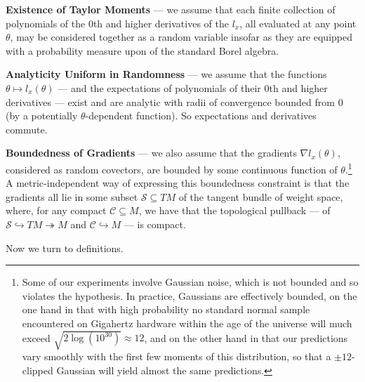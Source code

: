 \documentclass[anon,12pt]{colt2021} %
\newcommand{\Cc}{\mathcal{C}}   \newcommand{\CC}{\mathbb{C}}
\newcommand{\Ss}{\mathcal{S}}
\begin{document}
        \textbf{Existence of Taylor Moments} --- we assume
        that each finite collection of polynomials of the $0$th and higher
        derivatives of the $l_x$, all evaluated at any point $\theta$, may be
        considered together as a random variable insofar as they are equipped
        with a probability measure upon of the standard Borel algebra.

        \textbf{Analyticity Uniform in Randomness} --- we assume that
        the functions $\theta \mapsto l_x(\theta)$ --- and the expectations
        of polynomials of their $0$th and higher derivatives --- exist and are
        analytic with radii of convergence bounded from $0$ (by a potentially
        $\theta$-dependent function).  So expectations and derivatives commute. 

        \textbf{Boundedness of Gradients} --- we also assume that the gradients
        $\nabla l_x(\theta)$, considered as random covectors, are bounded by
        some continuous function of $\theta$.\footnote{
            Some of our experiments involve Gaussian noise, which is not
            bounded and so violates the hypothesis.  In practice, Gaussians are
            effectively bounded, on the one hand in that with high
            probability no standard normal sample encountered on Gigahertz
            hardware within the age of the universe will much exceed $\sqrt{2
            \log(10^{30})} \approx 12$, and on the other hand in that
            our predictions vary smoothly with the first few moments of this
            distribution, so that a $\pm 12$-clipped Gaussian will yield almost
            the same predictions.
        }
        A metric-independent way of expressing this boundedness constraint
        is that the gradients all lie in some subset $\Ss \subseteq TM$ of
        the tangent bundle of weight space, where, for any compact $\Cc
        \subseteq M$, we have that the topological pullback --- of
        $\Ss \hookrightarrow TM \twoheadrightarrow M$
        and
        $\Cc \hookrightarrow M$ ---
        is compact.
        
        Now we turn to definitions.
\end{document}
